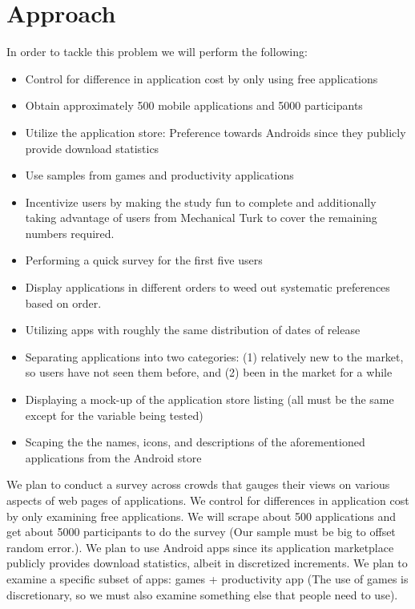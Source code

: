 \section{Approach}

In order to tackle this problem we will perform the following:

\begin{itemize}
\item Control for difference in application cost by only using free applications
\item Obtain approximately 500 mobile applications and 5000 participants 
\item Utilize the application store: Preference towards Androids since they publicly provide download statistics
\item Use samples from games and productivity applications
\item Incentivize users by making the study fun to complete and additionally taking advantage of users from Mechanical Turk to cover the remaining numbers required.
\item Performing a quick survey for the first five users
\item Display applications in different orders to weed out systematic preferences based on order.
\item Utilizing apps with roughly the same distribution of dates of release
\item Separating applications into two categories: (1) relatively new to the market, so users have not seen them before, and (2) been in the market for a while
\item Displaying a mock-up of the application store listing (all must be the same except for the variable being tested)
\item Scaping the the names, icons, and descriptions of the aforementioned applications from the Android store
\end{itemize}

We plan to conduct a survey across crowds that gauges their views on various aspects of web pages of applications. We control for differences in application cost by only examining free applications.
We will scrape about 500 applications and get about 5000 participants to do the survey (Our sample must be big to offset random error.).
We plan to use Android apps since its application marketplace publicly provides download statistics, albeit in discretized increments.
We plan to examine a specific subset of apps: games + productivity app (The use of games is discretionary, so we must also examine something else that people need to use). \\

